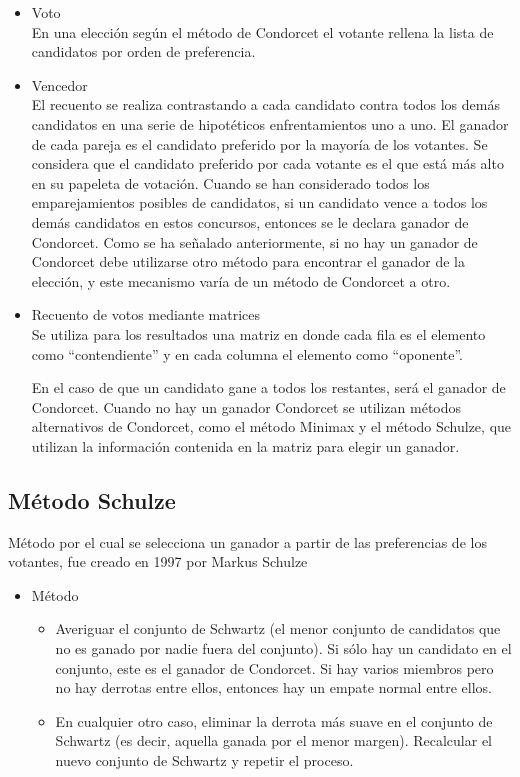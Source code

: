 \documentclass[12pt,a4paper,]{book}
\providecommand{\tightlist}{%
  \setlength{\itemsep}{0pt}\setlength{\parskip}{0pt}}
\numberwithin{dummy}{section}
\theoremstyle{ocrenumbox}
\theoremstyle{blacknumex}
\theoremstyle{blacknumbox}
\theoremstyle{ocrenum}
\theoremstyle{ocrenum}
\begin{document}
\begin{itemize}
\item
  Voto\\
  En una elección según el método de Condorcet el votante rellena la
  lista de candidatos por orden de preferencia.
\item
  Vencedor\\
  El recuento se realiza contrastando a cada candidato contra todos los
  demás candidatos en una serie de hipotéticos enfrentamientos uno a
  uno. El ganador de cada pareja es el candidato preferido por la
  mayoría de los votantes. Se considera que el candidato preferido por
  cada votante es el que está más alto en su papeleta de votación.
  Cuando se han considerado todos los emparejamientos posibles de
  candidatos, si un candidato vence a todos los demás candidatos en
  estos concursos, entonces se le declara ganador de Condorcet. Como se
  ha señalado anteriormente, si no hay un ganador de Condorcet debe
  utilizarse otro método para encontrar el ganador de la elección, y
  este mecanismo varía de un método de Condorcet a otro.
\item
  Recuento de votos mediante matrices\\
  Se utiliza para los resultados una matriz en donde cada fila es el
  elemento como ``contendiente'' y en cada columna el elemento como
  ``oponente''.

  En el caso de que un candidato gane a todos los restantes, será el
  ganador de Condorcet. Cuando no hay un ganador Condorcet se utilizan
  métodos alternativos de Condorcet, como el método Minimax y el método
  Schulze, que utilizan la información contenida en la matriz para
  elegir un ganador.
\end{itemize}

\hypertarget{muxe9todo-schulze}{%
\subsection{Método Schulze}\label{muxe9todo-schulze}}

Método por el cual se selecciona un ganador a partir de las preferencias
de los votantes, fue creado en 1997 por Markus Schulze

\begin{itemize}
\item
  Método

  \begin{itemize}
  \tightlist
  \item
    Averiguar el conjunto de Schwartz (el menor conjunto de candidatos
    que no es ganado por nadie fuera del conjunto). Si sólo hay un
    candidato en el conjunto, este es el ganador de Condorcet. Si hay
    varios miembros pero no hay derrotas entre ellos, entonces hay un
    empate normal entre ellos.
  \item
    En cualquier otro caso, eliminar la derrota más suave en el conjunto
    de Schwartz (es decir, aquella ganada por el menor margen).
    Recalcular el nuevo conjunto de Schwartz y repetir el proceso.
  \end{itemize}
\end{itemize}
\end{document}
